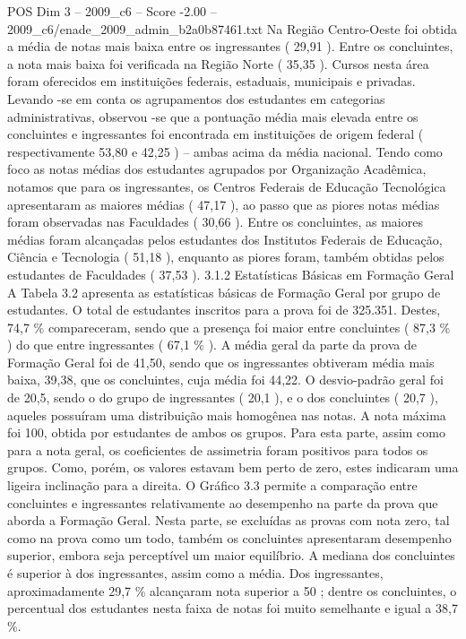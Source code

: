 \begin{textsample}{POS Dim 3 – 2009\_c6 – Score -2.00 – 2009\_c6/enade\_2009\_admin\_b2a0b87461.txt}
Na Região Centro-Oeste foi obtida a média de notas mais baixa entre os ingressantes ( 29,91 ).
Entre os concluintes, a nota mais baixa foi verificada na Região Norte ( 35,35 ).
Cursos nesta área foram oferecidos em instituições federais, estaduais, municipais e privadas.
Levando -se em conta os agrupamentos dos estudantes em categorias administrativas, observou -se que a pontuação média mais elevada entre os concluintes e ingressantes foi encontrada em instituições de origem federal ( respectivamente 53,80 e 42,25 ) – ambas acima da média nacional.
Tendo como foco as notas médias dos estudantes agrupados por Organização Acadêmica, notamos que para os ingressantes, os Centros Federais de Educação Tecnológica apresentaram as maiores médias ( 47,17 ), ao passo que as piores notas médias foram observadas nas Faculdades ( 30,66 ).
Entre os concluintes, as maiores médias foram alcançadas pelos estudantes dos Institutos Federais de Educação, Ciência e Tecnologia ( 51,18 ), enquanto as piores foram, também obtidas pelos estudantes de Faculdades ( 37,53 ). 3.1.2 Estatísticas Básicas em Formação Geral A Tabela 3.2 apresenta as estatísticas básicas de Formação Geral por grupo de estudantes.
O total de estudantes inscritos para a prova foi de 325.351.
Destes, 74,7 \% compareceram, sendo que a presença foi maior entre concluintes ( 87,3 \% ) do que entre ingressantes ( 67,1 \% ).
A média geral da parte da prova de Formação Geral foi de 41,50, sendo que os ingressantes obtiveram média mais baixa, 39,38, que os concluintes, cuja média foi 44,22.
O desvio-padrão geral foi de 20,5, sendo o do grupo de ingressantes ( 20,1 ), e o dos concluintes ( 20,7 ), aqueles possuíram uma distribuição mais homogênea nas notas.
A nota máxima foi 100, obtida por estudantes de ambos os grupos.
Para esta parte, assim como para a nota geral, os coeficientes de assimetria foram positivos para todos os grupos.
Como, porém, os valores estavam bem perto de zero, estes indicaram uma ligeira inclinação para a direita.
O Gráfico 3.3 permite a comparação entre concluintes e ingressantes relativamente ao desempenho na parte da prova que aborda a Formação Geral.
Nesta parte, se excluídas as provas com nota zero, tal como na prova como um todo, também os concluintes apresentaram desempenho superior, embora seja perceptível um maior equilíbrio.
A mediana dos concluintes é superior à dos ingressantes, assim como a média.
Dos ingressantes, aproximadamente 29,7 \% alcançaram nota superior a 50 ; dentre os concluintes, o percentual dos estudantes nesta faixa de notas foi muito semelhante e igual a 38,7 \%.

\end{textsample}
